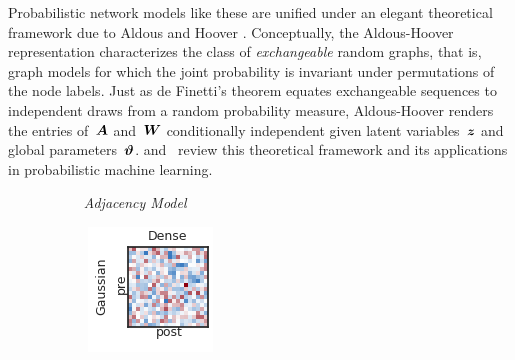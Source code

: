 Probabilistic network models like these are unified under an elegant
theoretical framework due to Aldous and Hoover
\citep{Aldous-1981,Hoover-1979}. Conceptually, the Aldous-Hoover
representation characterizes the class of \textit{exchangeable} random
graphs, that is, graph models for which the joint probability is
invariant under permutations of the node labels. Just as de Finetti's
theorem equates exchangeable sequences to independent draws from a
random probability measure, Aldous-Hoover renders the entries of~$\boldsymbol{A}$ and~$\boldsymbol{W}$ conditionally
independent given latent variables~$\boldsymbol{z}$ and global
parameters~$\boldsymbol{\vartheta}$. \citet{Lloyd-2012} and~\citet{orbanz2015bayesian}
review this theoretical framework and its applications in
probabilistic machine learning.

\begin{figure}[t!]
  \centering
  \textit{~~~~~Adjacency Model} \\
  \hspace{1em}
  \begin{subfigure}[b]{1.25in}
    \centering
    \includegraphics[width=\textwidth]{figures/ch3/Dense-Gaussian.png}
  \end{subfigure}
  ~
  \hspace{-.1in}
  \begin{subfigure}[b]{1.10in}

\end{subfigure}
\end{figure}
